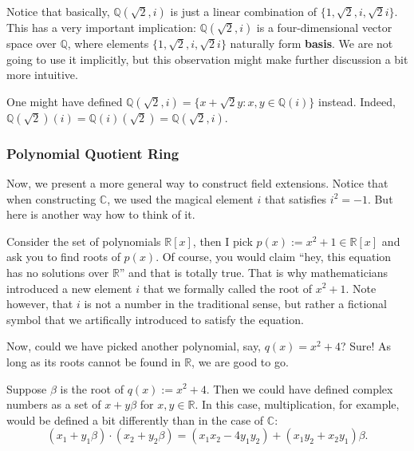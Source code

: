 \documentclass[../lecture-notes.tex]{subfiles}
\begin{document}
\begin{remark}
    Notice that basically, $\mathbb{Q}(\sqrt{2}, i)$ is just a linear combination of $\{1,\sqrt{2},i,\sqrt{2}i\}$. This has a very important implication: $\mathbb{Q}(\sqrt{2}, i)$ is a four-dimensional vector space over $\mathbb{Q}$, where elements $\{1,\sqrt{2},i,\sqrt{2}i\}$ naturally form \textbf{basis}. We are not going to use it implicitly, but this observation might make further discussion a bit more intuitive.
\end{remark}

\begin{remark}
    One might have defined $\mathbb{Q}(\sqrt{2}, i) = \{x+\sqrt{2}y: x,y \in \mathbb{Q}(i)\}$ instead. Indeed, $\mathbb{Q}(\sqrt{2})(i) = \mathbb{Q}(i)(\sqrt{2}) = \mathbb{Q}(\sqrt{2}, i)$.
\end{remark}

\subsubsection{Polynomial Quotient Ring}

Now, we present a more general way to construct field extensions. Notice that when constructing $\mathbb{C}$, we used the magical element $i$ that satisfies $i^2=-1$. But here is another way how to think of it.

Consider the set of polynomials $\mathbb{R}[x]$, then I pick $p(x):=x^2+1 \in \mathbb{R}[x]$ and ask you to find roots of $p(x)$. Of course, you would claim ``hey, this equation has no solutions over $\mathbb{R}$'' and that is totally true. That is why mathematicians introduced a new element $i$ that we formally called the root of $x^2+1$. Note however, that $i$ is not a number in the traditional sense, but rather a fictional symbol that we artifically introduced to satisfy the equation.

Now, could we have picked another polynomial, say, $q(x) = x^2+4$? Sure! As long as its roots cannot be found in $\mathbb{R}$, we are good to go.

\begin{example}
    Suppose $\beta$ is the root of $q(x):=x^2+4$. Then we could have defined complex numbers as a set of $x+y\beta$ for $x,y \in \mathbb{R}$. In this case, multiplication, for example, would be defined a bit differently than in the case of $\mathbb{C}$:
    \begin{equation}
        (x_1+y_1\beta) \cdot (x_2+y_2\beta) = (x_1x_2-4y_1y_2) + (x_1y_2+x_2y_1)\beta.
    \end{equation}
\end{example}
\end{document}
